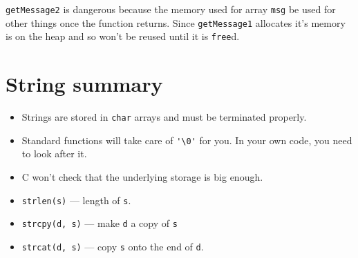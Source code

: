 \texttt{getMessage2} is dangerous because the memory used for array \texttt{msg} be used for other things once the function returns.
Since \texttt{getMessage1} allocates it's memory is on the heap and so won't be reused until it is \texttt{free}d.

\section*{String summary}
\begin{itemize}
 \item Strings are stored in \texttt{char} arrays and must be terminated properly.
 \item Standard functions will take care of \lstinline!'\0'! for you. In your own code, you need to look after it.
 \item C won't check that the underlying storage is big enough.
 \item \texttt{strlen(s)} --- length of \texttt{s}.
 \item \texttt{strcpy(d, s)} --- make \texttt{d} a copy of \texttt{s}
 \item \texttt{strcat(d, s)} --- copy \texttt{s} onto the end of \texttt{d}.
\end{itemize}
